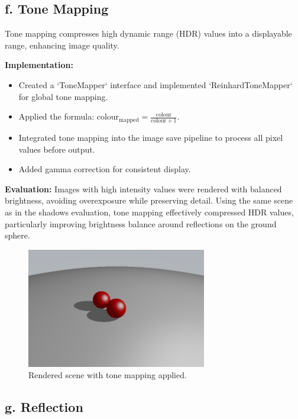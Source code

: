 \documentclass[11pt,a4paper]{article}
\begin{document}
\subsection{f. Tone Mapping}  
\label{sec:tone-mapping}

Tone mapping compresses high dynamic range (HDR) values into a displayable range, enhancing image quality.

\noindent\textbf{Implementation:}  
\begin{itemize}
    \item Created a `ToneMapper` interface and implemented `ReinhardToneMapper` for global tone mapping.  
    \item Applied the formula: \( \text{colour}_{\text{mapped}} = \frac{\text{colour}}{\text{colour} + 1} \).  
    \item Integrated tone mapping into the image save pipeline to process all pixel values before output.  
    \item Added gamma correction for consistent display.  
\end{itemize}

\noindent\textbf{Evaluation:}  
Images with high intensity values were rendered with balanced brightness, avoiding overexposure while preserving detail. Using the same scene as in the shadows evaluation, tone mapping effectively compressed HDR values, particularly improving brightness balance around reflections on the ground sphere.  

\begin{figure}[H]  
\centering  
\includegraphics[width=0.7\textwidth]{tone_mapped.png}  
\caption{Rendered scene with tone mapping applied.}  
\label{fig:tone-mapping}  
\end{figure}  

\subsection{g. Reflection}  
\label{sec:reflection}
\end{document}
